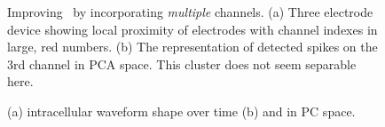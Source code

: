 \begin{center}
\begin{figure}[h!]
\begin{subfigure}[b]{.5\textwidth}
\caption{}
\label{3chpca}
\end{subfigure}
\caption{
Improving \smug\ by incorporating \emph{multiple} channels.
(a) Three electrode device showing local proximity of electrodes with channel indexes in large, red numbers. 
(b) The representation of detected spikes on the 3rd channel in PCA space. This cluster does not seem separable here.
}
\end{figure}
\end{center}



\begin{figure}[htbp]
	\centering
	\caption{(a) intracellular waveform shape over time (b) and in PC space.}
	\label{fig:pairs}
\end{figure}



